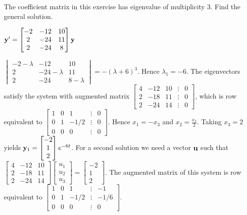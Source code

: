 \documentclass{ximera}
\begin{document}
 \begin{problem}\label{exer:10.5.28}
 The coefficient matrix in this exercise
has eigenvalue of multiplicity $3$. Find the
general solution.

$ {\bf y}'
= \begin{bmatrix}-2&-12&10\\2&-24&11\\2&-24&8\end{bmatrix}{\bf y}$

\begin{solution}
    $ \begin{vmatrix}-2-\lambda&-12&10\\2&-24-\lambda&11\\2&-24&8-\lambda\end{vmatrix}
=-(\lambda+6)^3$.
Hence $\lambda_1=-6$.
The eigenvectors
 satisfy the system with  augmented matrix
$ \begin{bmatrix}4&-12&10&\vdots&0\\2&-18&11&
\vdots&0\\2&-24&14&\vdots&0\end{bmatrix}$,
which is row equivalent to
$ \begin{bmatrix}1&0&1&\vdots&0\\0&1&-1/2&
\vdots&0\\0&0&0&\vdots&0\end{bmatrix}$.
Hence  $x_1=-x_3$ and $x_2= \frac{x_3}{2}$.  Taking $x_3=2$
yields
${\bf y}_1= \begin{bmatrix}-2\\1\\2\end{bmatrix}e^{-6t}$.
For a second solution we need a vector ${\bf u}$ such that
$ \begin{bmatrix}4&-12&10\\2&-18&11\\2&-24&14\end{bmatrix}\begin{bmatrix}u_1\\u_2\\u_3\end{bmatrix}
= \begin{bmatrix}-2\\1\\2\end{bmatrix}$.
The augmented matrix of this system is row equivalent to
$ \begin{bmatrix}1&0&1&\vdots&-1\\0&1&-1/2&
\vdots&-1/6\\0&0&0&\vdots&0\end{bmatrix}$.

\end{solution}
\end{problem}
\end{document}
